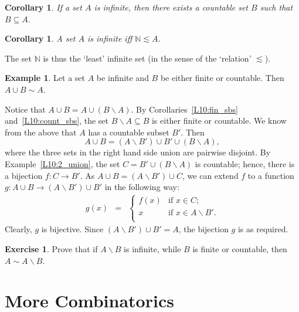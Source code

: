 \documentclass[12pt,notitlepage]{article}
\theoremstyle{plain}
\newtheorem{corr}[thm]{Corollary}
\theoremstyle{definition}
\newtheorem{exc}[thm]{Exercise}
\newtheorem{exm}[thm]{Example}
\theoremstyle{plain}
\newcommand{\N}{\mathbb{N}}
\newcommand{\sbs}{\subseteq}
\renewcommand{\setminus}{\smallsetminus}
\newcommand{\1}{\mathbf{1}}
\newcommand{\0}{\mathbf{0}}
\newcommand{\mcomm}[1]{}
\begin{document}
\begin{corr}
If a set $A$ is infinite, then there exists a countable set $B$ such that $B \sbs A$.
\end{corr}

\begin{corr}\label{L10:min_inf_corr}
A set $A$ is infinite iff $\N \lesssim A$.
\end{corr}
\noindent The set $\N$ is thus the `least' infinite set (in the sense of the `relation' ${\lesssim}$).

\begin{exm}
Let a set $A$ be infinite and $B$ be either finite or countable. Then $A \cup B \sim A$.

Notice that $A \cup B = A \cup (B \setminus A)$. By Corollaries~\ref{L10:fin_sbs} and~\ref{L10:count_sbs}, the set $B \setminus A \sbs B$ is either finite or countable. We know from the above that $A$ has a countable subset $B'$. Then
$$A \cup B = (A \setminus B') \cup B' \cup (B \setminus A),$$
where the three sets in the right hand side union are pairwise disjoint. By Example~\ref{L10:2_union}, the set $C = B' \cup (B \setminus A)$ is countable; hence, there is a bijection $f\colon C \to B'$. As $A \cup B = (A \setminus B') \cup C$, we can extend $f$ to a function $g\colon A \cup B \to (A \setminus B') \cup B'$ in the following way:
$$
\begin{array}{rcll}
g(x) &=& \begin{cases}
			f(x)&\mbox{if } x \in C;\\
			x&\mbox{if } x \in A \setminus B'.\\
		\end{cases}
\end{array}
$$
Clearly, $g$ is bijective. Since $(A \setminus B') \cup B' = A$, the bijection $g$ is as required.
\end{exm}

\begin{exc}
Prove that if $A \setminus B$ is infinite, while $B$ is finite or countable, then $A \sim A \setminus B$.
\end{exc}

\section{More Combinatorics}
\mcomm{Traditionally, the elements of combinatorics are presented informally, with very little reference to set theory. The benefits of this approach are well-known, but it has clear drawbacks in the context of a set-based course: first, it breaks the logical sequence of presentation (so that the Student may think set theory axioms are useless and inadequate for ``everyday mathematics'' besides being abstract and possibly indigestible); second, our intuition is limited, so one may lose comprehension beyond some point with little chance to dissect a complicated intuitive argument into primitive steps. Therefore, our approach is to make combinatorial computations as close to set-theoretic primitives as reasonably possible. Of course, enough practice will develop the Student's intuition so that he can see traditional arguments as shorthands for formal ones.}
\end{document}

